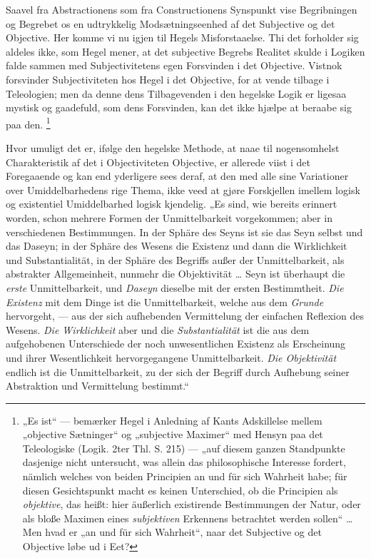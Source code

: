 \documentclass[11pt]{book}
\newcommand{\opage}[1]{\marginnote{\footnotesize\textit{[#1]}}}
\begin{document}
Saavel fra Abstractionens som fra Constructionens Synspunkt vise
Begribningen og Begrebet os en udtrykkelig Modsætningseenhed af det
Subjective og det Objective. Her komme vi nu igjen til Hegels
Misforstaaelse. Thi det forholder sig aldeles ikke, som Hegel mener,
at det subjective Begrebs Realitet skulde i Logiken falde sammen med
Subjectivitetens egen Forsvinden i det Objective. Vistnok forsvinder
Subjectiviteten hos Hegel i det Objective, for at vende tilbage i
Teleologien; men da denne dens Tilbagevenden i den hegelske Logik er
ligesaa mystisk og gaadefuld, som dens Forsvinden, kan det ikke hjælpe
at beraabe sig paa den.%
\footnote{„Es ist“ --- bemærker Hegel i Anledning af Kants Adskillelse
mellem „objective Sætninger“ og „subjective Maximer“ med Hensyn paa
det Teleologiske (Logik. 2ter Thl. S. 215) --- „auf diesem
ganzen Standpunkte dasjenige nicht untersucht, was allein das
philosophische Interesse fordert, nämlich welches von beiden
Principien an und für sich Wahrheit habe; für diesen Gesichtspunkt
macht es keinen Unterschied, ob die Principien als \emph{objektive},
das heißt: hier äußerlich existirende Bestimmungen der Natur, oder als
bloße Maximen eines \emph{subjektiven} Erkennens betrachtet werden
sollen“ \dots{} Men hvad er „an und für sich Wahrheit“, naar det
Subjective og det Objective løbe ud i Eet?}

\opage{165} \setcounter{footnote}{0}%
Hvor umuligt det er, ifølge den hegelske Methode, at naae til
nogensomhelst Charakteristik af det i Objectiviteten Objective, er
allerede viist i det Foregaaende og kan end yderligere sees deraf, at
den med alle sine Variationer over Umiddelbarhedens rige Thema, ikke
veed at gjøre Forskjellen imellem logisk og existentiel Umiddelbarhed
logisk kjendelig. „Es sind, wie bereits erinnert worden, schon mehrere
Formen der Unmittelbarkeit vorgekommen; aber in verschiedenen
Bestimmungen. In der Sphäre des Seyns ist sie das Seyn selbst und das
Daseyn; in der Sphäre des Wesens die Existenz und dann die
Wirklichkeit und Substantialität, in der Sphäre des Begriffs außer der
Unmittelbarkeit, als abstrakter Allgemeinheit, nunmehr die
Objektivität \dots{} Seyn ist überhaupt die \emph{erste}
Unmittelbarkeit, und \emph{Daseyn} dieselbe mit der ersten
Bestimmtheit. \emph{Die Existenz} mit dem Dinge ist die
Unmittelbarkeit, welche aus dem \emph{Grunde} hervorgeht, --- aus der
sich aufhebenden Vermittelung der einfachen Reflexion des Wesens.
\emph{Die Wirklichkeit} aber und die \emph{Substantialität} ist die
aus dem aufgehobenen Unterschiede der noch unwesentlichen Existenz als
Erscheinung und ihrer Wesentlichkeit hervorgegangene Unmittelbarkeit.
\emph{Die Objektivität} endlich ist die Unmittelbarkeit, zu der sich
der Begriff durch Aufhebung seiner Abstraktion und Vermittelung
bestimmt.“
\end{document}
